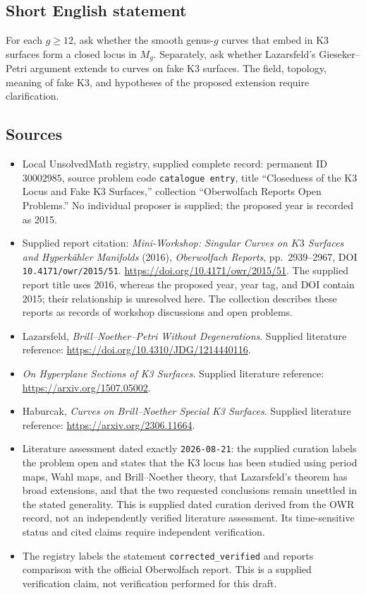 \documentclass[11pt]{article}
\begin{document}
\subsection{Short English statement}
For each \(g\geq12\), ask whether the smooth genus-\(g\) curves that embed in K3 surfaces form a closed locus in \(M_g\). Separately, ask whether Lazarsfeld's Gieseker--Petri argument extends to curves on fake K3 surfaces. The field, topology, meaning of fake K3, and hypotheses of the proposed extension require clarification.
\subsection{Sources}
\begin{itemize}
\item Local UnsolvedMath registry, supplied complete record: permanent ID \(30002985\), source problem code \texttt{catalogue entry}, title ``Closedness of the K3 Locus and Fake K3 Surfaces,'' collection ``Oberwolfach Reports Open Problems.'' No individual proposer is supplied; the proposed year is recorded as 2015.
\item Supplied report citation: \emph{Mini-Workshop: Singular Curves on \(K3\) Surfaces and Hyperkähler Manifolds} (2016), \emph{Oberwolfach Reports}, pp.\ 2939--2967, DOI \texttt{10.4171/owr/2015/51}. \url{https://doi.org/10.4171/owr/2015/51}. The supplied report title uses 2016, whereas the proposed year, year tag, and DOI contain 2015; their relationship is unresolved here. The collection describes these reports as records of workshop discussions and open problems.
\item Lazarsfeld, \emph{Brill--Noether--Petri Without Degenerations}. Supplied literature reference: \url{https://doi.org/10.4310/JDG/1214440116}.
\item \emph{On Hyperplane Sections of K3 Surfaces}. Supplied literature reference: \url{https://arxiv.org/1507.05002}.
\item Haburcak, \emph{Curves on Brill--Noether Special K3 Surfaces}. Supplied literature reference: \url{https://arxiv.org/2306.11664}.
\item Literature assessment dated exactly \texttt{2026-08-21}: the supplied curation labels the problem open and states that the K3 locus has been studied using period maps, Wahl maps, and Brill--Noether theory, that Lazarsfeld's theorem has broad extensions, and that the two requested conclusions remain unsettled in the stated generality. This is supplied dated curation derived from the OWR record, not an independently verified literature assessment. Its time-sensitive status and cited claims require independent verification.
\item The registry labels the statement \texttt{corrected\_verified} and reports comparison with the official Oberwolfach report. This is a supplied verification claim, not verification performed for this draft.
\end{itemize}
\end{document}
